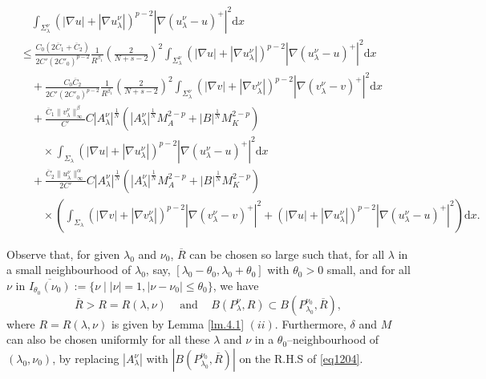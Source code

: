 \documentclass[10pt,a4paper]{amsart}
\begin{document}
\begin{align}\label{eq1204}
&\quad\int_{\Sigma^{\nu}_\lambda} (|\nabla u|+|\nabla u^{\nu}_{\lambda}|)^{p-2} |\nabla(u^{\nu}_{\lambda}-u)^+|^2 \mathrm{d}x \\
&\leq \frac{C_0(2\overline{C}_1+\overline{C}_2)}{2C'(2C'_0)^{p-2}} \frac{1}{R^{\beta_1}}\left(\frac{2}{N+s-2}\right)^2 \int_{\Sigma_\lambda^\nu}(|\nabla u|+|\nabla u^{\nu}_{\lambda}|)^{p-2} |\nabla (u^{\nu}_{\lambda}-u)^+|^2 \mathrm{d}x \nonumber\\
& \quad +\frac{ C_0\overline{C}_2}{2C'(2C'_0)^{p-2}}\frac{1}{R^{\beta_1}}\left(\frac{2}{N+s-2}\right)^2\int_{\Sigma_\lambda^\nu} (|\nabla v|+|\nabla v^{\nu}_{\lambda}|)^{p-2} |\nabla(v^{\nu}_{\lambda}-v )^+|^2 \mathrm{d}x  \nonumber\\
&\quad +\frac{\overline{C}_1\|v^\nu_\lambda\|^\beta_\infty }{C'}C |A_\lambda^\nu|^\frac{1}{N} \left(  |A_\lambda^\nu|^\frac{1}{N} M_A^{2-p}+|B|^\frac{1}{N} M_K^{2-p}\right)  \nonumber\\
&\quad \quad \times \int_{\Sigma_\lambda} (|\nabla u|+|\nabla u^{\nu}_{\lambda}|)^{p-2} |\nabla(u^{\nu}_{\lambda}-u )^+|^2 \mathrm{d}x \nonumber\\
 &\quad +\frac{\overline{C}_2\|u^\nu_\lambda\|^\alpha_\infty }{2C'}C |A_\lambda^\nu|^\frac{1}{N} \left(|A_\lambda^\nu|^\frac{1}{N} M_A^{2-p}+ |B|^\frac{1}{N} M_K^{2-p} \right)  \nonumber\\
&\quad \quad \times \left(\int_{\Sigma_\lambda} (|\nabla v|+|\nabla v^{\nu}_{\lambda}|)^{p-2} |\nabla(v^{\nu}_{\lambda}-v )^+|^2 +(|\nabla u|+|\nabla u^{\nu}_{\lambda}|)^{p-2} |\nabla(u^{\nu}_{\lambda}-u )^+|^2\right)\mathrm{d}x. \nonumber
\end{align}

\begin{rem}\label{re.4.1}
Observe that, for given $\lambda_0$ and $\nu_0$, $\overline{R}$ can be chosen so large such that, for all $\lambda$ in a small neighbourhood of $\lambda_0$, say, $[ \lambda_0-\theta_0 ,\lambda_0 + \theta_0 ]$ with $\theta_{0}>0$ small, and for all $\nu$ in $\overline{I_{\theta_0}(\nu_0)}:=\{ \nu \mid |\nu|=1,|\nu-\nu_0|\leq \theta_0 \}$, we have
$$ \overline{R}>R=R(\lambda,\nu)\,\quad \mbox{and}\,\quad B(P_\lambda^\nu,R)\subset B(P_{\lambda_0}^{\nu_0},\overline{R}), $$
where $R=R(\lambda,\nu)$ is given by Lemma \ref{lm.4.1} $(ii)$. Furthermore, $\delta$ and $M$ can also be chosen uniformly for all these $\lambda$ and $\nu$ in a $\theta_0$--neighbourhood of $(\lambda_0,\nu_0)$, by replacing $|A_\lambda^\nu|$ with $|B(P_{\lambda_0}^{\nu_0},\overline{R})|$ on the R.H.S of \eqref{eq1204}.
\end{rem}
\end{document}
